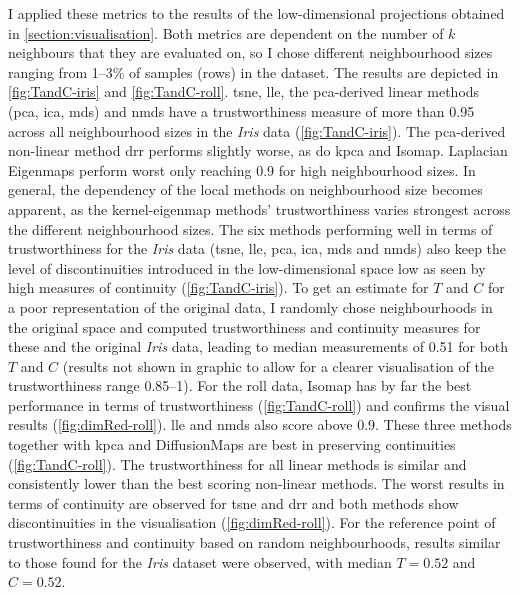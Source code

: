 I applied these metrics to the results of the low-dimensional projections obtained in \cref{section:visualisation}. Both metrics are dependent on the number of \(k\) neighbours that they are evaluated on, so I chose different neighbourhood sizes ranging from \numrange{1}{3}\% of samples (rows) in the dataset. The results are depicted in \cref{fig:TandC-iris} and \cref{fig:TandC-roll}. \gls{tsne}, \gls{lle}, the \gls{pca}-derived linear methods (\gls{pca}, \gls{ica}, \gls{mds}) and \gls{nmds} have a trustworthiness measure of more than \num{0.95} across all neighbourhood sizes in the \textit{Iris} data (\cref{fig:TandC-iris}). The \gls{pca}-derived non-linear method \gls{drr} performs slightly worse, as do \gls{kpca} and Isomap. Laplacian Eigenmaps perform worst only reaching \num{0.9} for high neighbourhood sizes. In general, the dependency of the local methods on neighbourhood size becomes apparent, as the kernel-eigenmap methods' trustworthiness varies strongest across the different neighbourhood sizes. The six methods performing well in terms of trustworthiness for the \textit{Iris} data (\gls{tsne}, \gls{lle}, \gls{pca}, \gls{ica}, \gls{mds} and \gls{nmds}) also keep the level of discontinuities introduced in the low-dimensional space low as seen by high measures of continuity (\cref{fig:TandC-iris}). To get an estimate for \(T\) and \(C\) for a poor representation of the original data, I randomly chose neighbourhoods in the original space and computed trustworthiness and continuity measures for these and the original \textit{Iris} data, leading to median measurements of \num{0.51} for both \(T\) and \(C\) (results not shown in graphic to allow for a clearer visualisation of the trustworthiness range \numrange{0.85}{1}).  For the roll data, Isomap has by far the best performance in terms of trustworthiness (\cref{fig:TandC-roll}) and confirms the visual results (\cref{fig:dimRed-roll}). \gls{lle} and \gls{nmds} also score above \num{0.9}. These three methods together with \gls{kpca} and DiffusionMaps are best in preserving continuities (\cref{fig:TandC-roll}). The trustworthiness for all linear methods is similar and consistently lower than the best scoring non-linear methods. The worst results in terms of continuity are observed for \gls{tsne} and \gls{drr} and both methods show discontinuities in the visualisation (\cref{fig:dimRed-roll}).  For the reference point of trustworthiness and continuity based on random neighbourhoods, results similar to those found for the \textit{Iris} dataset were observed, with median \(T=0.52\) and \(C=0.52\).


